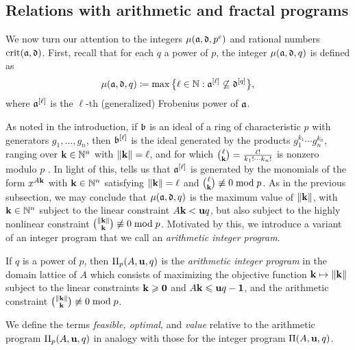 \documentclass{amsart}
\begin{document}
\subsection{Relations with arithmetic and fractal programs}

We now turn our attention to the integers $\mu(\mathfrak{a}, \mathfrak{d}, p^e)$ and rational numbers $\operatorname{crit}(\mathfrak{a},\mathfrak{d})$.
First, recall that for each $q$ a power of $p$, the integer $\mu(\mathfrak{a}, \mathfrak{d}, q)$ is defined as
\[\mu(\mathfrak{a},\mathfrak{d},q) \coloneqq \max\big\{ \ell \in \mathbb{N} : \mathfrak{a}^{[\ell]} \not\subseteq \mathfrak{d}^{[q]}\big\},\]
where $\mathfrak{a}^{[\ell]}$ is the $\ell$-th (generalized) Frobenius power of $\mathfrak{a}$.

As noted in the introduction, if $\mathfrak{b}$ is an ideal of a ring of characteristic $p$ with generators $g_1, \ldots, g_n$, then $\mathfrak{b}^{[\ell]}$ is the ideal generated by the products $g_1^{k_1}\cdots g_n^{k_n}$, ranging over $\mathbf{k} \in \mathbb{N}^n$ with $\| \mathbf{k} \|=\ell$, and for which  $\binom{\ell}{\mathbf{k}} =
\frac{\ell!}{k_1 ! \cdots k_n !}$ is nonzero modulo $p$  \cite[Proposition~3.5]{hernandez+etal.frobenius_powers}.
In light of this,  tells us that $\mathfrak{a}^{[\ell]}$ is generated by the monomials of the form $x^{A \mathbf{k}}$ with $\mathbf{k} \in \mathbb{N}^n$ satisfying $\| \mathbf{k} \|=\ell$ and $\binom{\ell}{\mathbf{k}} \not\equiv 0 \bmod p$.  As in the previous subsection, we may conclude that $\mu(\mathfrak{a},\mathfrak{d},q)$ is the maximum value of $\| \mathbf{k} \|$, with $\mathbf{k} \in \mathbb{N}^n$ subject to the linear constraint $A\mathbf{k} < \mathbf{u}q$, but also subject to the highly nonlinear constraint $\binom{\| \mathbf{k} \|}{\mathbf{k}} \not\equiv 0 \bmod{p}$.  Motivated by this, we introduce a variant of an integer program that we call an \emph{arithmetic integer program}.

\begin{definition}
\label{aip: D}
If $q$ is a power of $p$, then $\Pi_p(A, \mathbf{u}, q)$ is the \emph{arithmetic integer program} in the domain lattice of $A$ which consists of maximizing the objective function $\mathbf{k} \mapsto \| \mathbf{k} \|$ subject to the linear constraints $\mathbf{k} \geqslant \mathbf{0}$ and $A \mathbf{k} \leqslant \mathbf{u}q - \mathbf{1}$, and the arithmetic constraint $\binom{\| \mathbf{k} \|}{\mathbf{k}} \not \equiv 0 \bmod p$.
\end{definition}

We define the terms \emph{feasible, optimal}, and \emph{value} relative to the arithmetic program $\Pi_p(A, \mathbf{u}, q)$ in analogy with those for the integer program $\Pi(A, \mathbf{u}, q)$.
\end{document}
